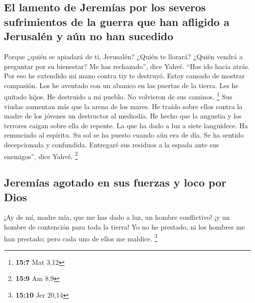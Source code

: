 \begin{paracol}{2}
\hypertarget{el-lamento-de-jeremuxedas-por-los-severos-sufrimientos-de-la-guerra-que-han-afligido-a-jerusaluxe9n-y-auxfan-no-han-sucedido}{%
\subsection{El lamento de Jeremías por los severos sufrimientos de la
guerra que han afligido a Jerusalén y aún no han
sucedido}\label{el-lamento-de-jeremuxedas-por-los-severos-sufrimientos-de-la-guerra-que-han-afligido-a-jerusaluxe9n-y-auxfan-no-han-sucedido}}

 Porque ¿quién se apiadará de ti, Jerusalén? ¿Quién te
llorará? ¿Quién vendrá a preguntar por su bienestar?  Me
has rechazado'', dice Yahvé. ``Has ido hacia atrás. Por eso he extendido
mi mano contra tiy te destruyó. Estoy cansado de mostrar compasión.
 Los he aventado con un abanico en las puertas de la
tierra. Les he quitado hijos. He destruido a mi pueblo. No volvieron de
sus caminos. \footnote{\textbf{15:7} Mat 3,12}  Sus viudas
aumentan más que la arena de los mares. He traído sobre ellos contra la
madre de los jóvenes un destructor al mediodía. He hecho que la angustia
y los terrores caigan sobre ella de repente.  La que ha
dado a luz a siete languidece. Ha renunciado al espíritu. Su sol se ha
puesto cuando aún era de día. Se ha sentido decepcionada y confundida.
Entregaré sus residuos a la espada ante sus enemigos'', dice Yahvé.
\footnote{\textbf{15:9} Am 8,9}

\hypertarget{jeremuxedas-agotado-en-sus-fuerzas-y-loco-por-dios}{%
\subsection{Jeremías agotado en sus fuerzas y loco por
Dios}\label{jeremuxedas-agotado-en-sus-fuerzas-y-loco-por-dios}}

 ¡Ay de mí, madre mía, que me has dado a luz, un hombre
conflictivo! ¡y un hombre de contención para toda la tierra! Yo no he
prestado, ni los hombres me han prestado; pero cada uno de ellos me
maldice. \footnote{\textbf{15:10} Jer 20,14}


\end{paracol}
